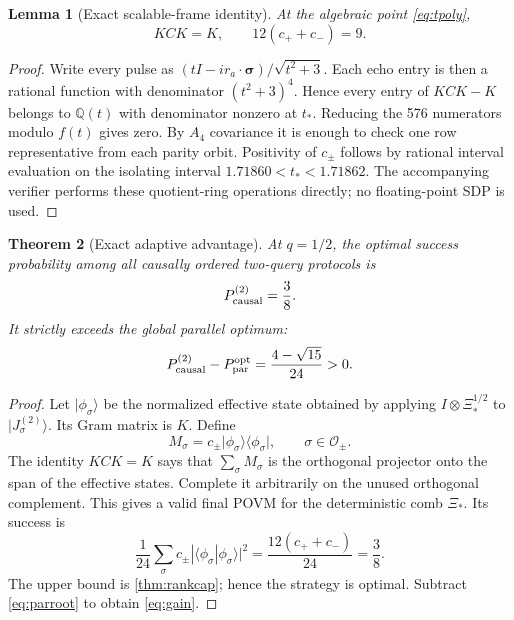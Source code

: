 \documentclass[11pt]{article}
\newtheorem{theorem}{Theorem}[section]
\newtheorem{lemma}[theorem]{Lemma}
\theoremstyle{definition}
\newcommand{\cO}{\mathcal O}
\newcommand{\ket}[1]{\lvert #1\rangle}
\newcommand{\proj}[1]{\lvert #1\rangle\!\langle #1\rvert}
\begin{document}
\begin{lemma}[Exact scalable-frame identity]\label{lem:KCK}
At the algebraic point \cref{eq:tpoly},
\begin{equation}\label{eq:KCK}
 KCK=K,\qquad 12(c_++c_-)=9.
\end{equation}
\end{lemma}

\begin{proof}
Write every pulse as
$(tI-ir_a\cdot\bm\sigma)/\sqrt{t^2+3}$.  Each echo entry is then a rational
function with denominator $(t^2+3)^4$.  Hence every entry of $KCK-K$ belongs
to $\mathbb Q(t)$ with denominator nonzero at $t_*$.  Reducing the 576
numerators modulo $f(t)$ gives zero.  By $A_4$ covariance it is enough to
check one row representative from each parity orbit.  Positivity of $c_\pm$
follows by rational interval evaluation on the isolating interval
$1.71860<t_*<1.71862$.  The accompanying verifier performs these quotient-ring
operations directly; no floating-point SDP is used.
\end{proof}

\begin{theorem}[Exact adaptive advantage]\label{thm:adaptive}
At $q=1/2$, the optimal success probability among all causally ordered
two-query protocols is
\begin{equation}\label{eq:causalexact}
 P_{\rm causal}^{(2)}=\frac38.
\end{equation}
It strictly exceeds the global parallel optimum:
\begin{equation}\label{eq:gain}
 P_{\rm causal}^{(2)}-P_{\rm par}^{\rm opt}
 =\frac{4-\sqrt{15}}{24}>0.
\end{equation}
\end{theorem}

\begin{proof}
Let $\ket{\phi_\sigma}$ be the normalized effective state obtained by applying
$I\otimes\Xi_*^{1/2}$ to $\ket{J_\sigma^{(2)}}$.  Its Gram matrix is $K$.
Define
\[
 M_\sigma=c_\pm\proj{\phi_\sigma},
 \qquad \sigma\in\cO_\pm.
\]
The identity $KCK=K$ says that
$\sum_\sigma M_\sigma$ is the orthogonal projector onto the span of the
effective states.  Complete it arbitrarily on the unused orthogonal
complement.  This gives a valid final POVM for the deterministic comb
$\Xi_*$.  Its success is
\[
 \frac1{24}\sum_\sigma c_\pm
 |\langle\phi_\sigma|\phi_\sigma\rangle|^2
 =\frac{12(c_++c_-)}{24}=\frac38.
\]
The upper bound is \cref{thm:rankcap}; hence the strategy is optimal.  Subtract
\cref{eq:parroot} to obtain \cref{eq:gain}.
\end{proof}
\end{document}
